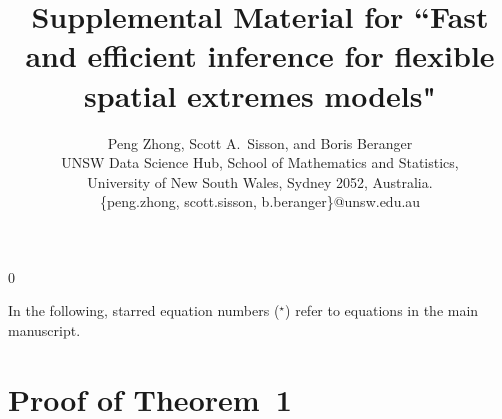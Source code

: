 \documentclass[12pt]{article}
\newcommand{\blind}{0}
\begin{document}
\def\spacingset#1{\renewcommand{\baselinestretch}%
{#1}\small\normalsize} \spacingset{1}

\title{\bf Supplemental Material for ``Fast and efficient inference for flexible spatial extremes models"}
\blind
{
  \author{Peng Zhong, Scott A.~Sisson, and Boris Beranger \\ 
  UNSW Data Science Hub, School of Mathematics and Statistics,\\ University of New South Wales, Sydney 2052, Australia. \\
  \{peng.zhong, scott.sisson, b.beranger\}@unsw.edu.au}
  \maketitle
} \fi


\baselineskip=26pt

\appendix

In the following, starred equation numbers ($^\star$) refer to equations in the main manuscript.

\section{Proof of Theorem~1}
\end{document}
